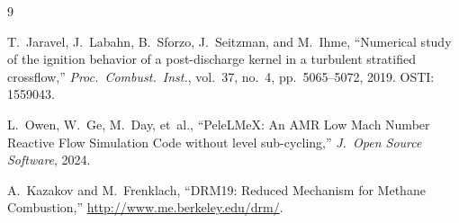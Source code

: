\documentclass[11pt]{article}
\begin{document}
\begin{thebibliography}{9}

T.~Jaravel, J.~Labahn, B.~Sforzo, J.~Seitzman, and M.~Ihme,
``Numerical study of the ignition behavior of a post-discharge kernel in a turbulent stratified crossflow,''
\textit{Proc.\ Combust.\ Inst.}, vol.~37, no.~4, pp.~5065--5072, 2019.
OSTI: 1559043.

L.~Owen, W.~Ge, M.~Day, et~al.,
``PeleLMeX: An AMR Low Mach Number Reactive Flow Simulation Code without level sub-cycling,''
\textit{J.\ Open Source Software}, 2024.

A.~Kazakov and M.~Frenklach,
``DRM19: Reduced Mechanism for Methane Combustion,''
\url{http://www.me.berkeley.edu/drm/}.

\end{thebibliography}
\end{document}

